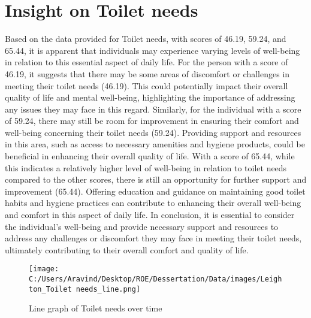 \documentclass[10pt, a4paper]{article}%
\begin{document}
\section{Insight on Toilet needs}%
\label{sec:InsightonToiletneeds}%
Based on the data provided for Toilet needs, with scores of 46.19, 59.24, and 65.44, it is apparent that individuals may experience varying levels of well{-}being in relation to this essential aspect of daily life. \newline%
\newline%
For the person with a score of 46.19, it suggests that there may be some areas of discomfort or challenges in meeting their toilet needs (46.19). This could potentially impact their overall quality of life and mental well{-}being, highlighting the importance of addressing any issues they may face in this regard.\newline%
\newline%
Similarly, for the individual with a score of 59.24, there may still be room for improvement in ensuring their comfort and well{-}being concerning their toilet needs (59.24). Providing support and resources in this area, such as access to necessary amenities and hygiene products, could be beneficial in enhancing their overall quality of life.\newline%
\newline%
With a score of 65.44, while this indicates a relatively higher level of well{-}being in relation to toilet needs compared to the other scores, there is still an opportunity for further support and improvement (65.44). Offering education and guidance on maintaining good toilet habits and hygiene practices can contribute to enhancing their overall well{-}being and comfort in this aspect of daily life.\newline%
\newline%
In conclusion, it is essential to consider the individual's well{-}being and provide necessary support and resources to address any challenges or discomfort they may face in meeting their toilet needs, ultimately contributing to their overall comfort and quality of life.%


\begin{figure}[H]%
\centering%
\texttt{[image: C:/Users/Aravind/Desktop/ROE/Dessertation/Data/images/Leighton\_Toilet needs\_line.png]}%
\caption{Line graph of Toilet needs over time}%
\end{figure}

%
\end{document}
